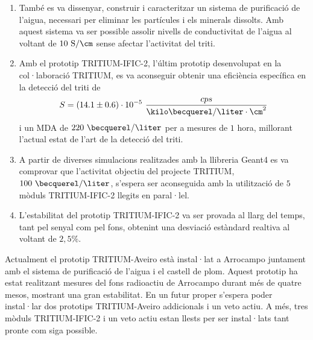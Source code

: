 \begin{enumerate}
\item{} També es va dissenyar, construir i caracteritzar un sistema de purificació de l'aigua, necessari per eliminar les partícules i els minerals dissolts. Amb aquest sistema va ser possible assolir nivells de conductivitat de l'aigua al voltant de $10~\text{S}/\cm$ sense afectar l'activitat del triti.

\item{} Amb el prototip TRITIUM-IFIC-2, l'últim prototip desenvolupat en la col·laboració TRITIUM, es va aconseguir obtenir una eficiència específica en la detecció del triti de
$$S = (14.1 \pm 0.6)\cdot{} 10^{-5}~\frac{cps}{\kilo\becquerel/\liter \cdot{} \cm^{2}}$$
i un MDA de $220~\becquerel/\liter$ per a mesures de $1$ hora, millorant l'actual estat de l'art de la detecció del triti.

\item{} A partir de diverses simulacions realitzades amb la llibreria Geant4 es va comprovar que l'activitat objectiu del projecte TRITIUM, $100~\becquerel/\liter$, s'espera ser aconseguida amb la utilització de $5$ mòduls TRITIUM-IFIC-2 llegits en paral·lel.

\item{} L'estabilitat del prototip TRITIUM-IFIC-2 va ser provada al llarg del temps, tant pel senyal com pel fons, obtenint una desviació estàndard realtiva al voltant de $2,5\%$.

\end{enumerate}

Actualment el prototip TRITIUM-Aveiro està instal·lat a Arrocampo juntament amb el sistema de purificació de l'aigua i el castell de plom. Aquest prototip ha estat realitzant mesures del fons radioactiu de Arrocampo durant més de quatre mesos, mostrant una gran estabilitat. En un futur proper s'espera poder instal·lar dos prototips TRITIUM-Aveiro addicionals i un veto actiu. A més, tres mòduls TRITIUM-IFIC-2 i un veto actiu estan llests per ser instal·lats tant pronte com siga possible.